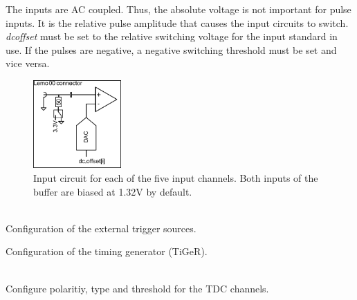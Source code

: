 			 \noindent The inputs are AC coupled. Thus, the absolute voltage is not important for pulse inputs. It is the relative pulse amplitude that causes the input circuits to switch. \textit{dc\tu offset} must be set to the relative switching voltage for the input standard in use. If the pulses are negative, a negative switching threshold must be set and vice versa.
			\begin{figure}
				\begin{center}
					\includegraphics[width=0.3\textwidth]{figures/InputCircuit.pdf}
					\caption{Input circuit for each of the five input channels. Both inputs of the buffer are biased at 1.32V by default.\label{fig:dcoffset1}}
				\end{center}
			\end{figure}

			\\
			Configuration of the external trigger sources.\par

			Configuration of the timing generator (TiGeR).

			\\
			Configure polaritiy, type and threshold for the TDC channels.

